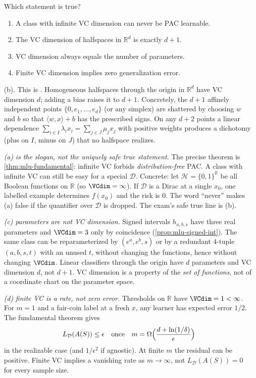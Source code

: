 \begin{exercise}
\label{ex:mlu-vc-mcq}
Which statement is true?
\begin{enumerate}[label=(\alph*)]
    \item A class with infinite VC dimension can never be PAC learnable.
    \item The VC dimension of halfspaces in $\mathbb{R}^d$ is exactly $d+1$.
    \item VC dimension always equals the number of parameters.
    \item Finite VC dimension implies zero generalization error.
\end{enumerate}
\end{exercise}

\begin{solution}
(b). This is . Homogeneous halfspaces through the origin in $\mathbb{R}^d$ have VC dimension $d$; adding a bias raises it to $d+1$. Concretely, the $d+1$ affinely independent points $\{0,e_1,\dots,e_d\}$ (or any simplex) are shattered by choosing $w$ and $b$ so that $\langle w,x\rangle+b$ has the prescribed signs. On any $d+2$ points a linear dependence $\sum_{i\in I}\lambda_i x_i=\sum_{j\in J}\mu_j x_j$ with positive weights produces a dichotomy (plus on $I$, minus on $J$) that no halfspace realizes.

\textit{(a) is the slogan, not the uniquely safe true statement.}
The precise theorem is \cref{thm:mlu-fundamental}: infinite VC forbids \emph{distribution-free} PAC. A class with infinite VC can still be easy for a special $\mathcal{D}$. Concrete: let $\mathcal{H}=\{0,1\}^{\mathbb{R}}$ be all Boolean functions on $\mathbb{R}$ (so $\VCdim=\infty$). If $\mathcal{D}$ is a Dirac at a single $x_0$, one labelled example determines $f(x_0)$ and the risk is $0$. The word ``never'' makes (a) false if the quantifier over $\mathcal{D}$ is dropped. The exam's safe true line is (b).

\textit{(c) parameters are not VC dimension.}
Signed intervals $h_{a,b,s}$ have three real parameters and $\VCdim=3$ only by coincidence (\cref{prop:mlu-signed-int}). The same class can be reparameterized by $(e^a,e^b,s)$ or by a redundant $4$-tuple $(a,b,s,t)$ with an unused $t$, without changing the functions, hence without changing $\VCdim$. Linear classifiers through the origin have $d$ parameters and VC dimension $d$, not $d+1$. VC dimension is a property of the \emph{set of functions}, not of a coordinate chart on the parameter space.

\textit{(d) finite VC is a rate, not zero error.}
Thresholds on $\mathbb{R}$ have $\VCdim=1<\infty$. For $m=1$ and a fair-coin label at a fresh $x$, any learner has expected error $1/2$. The fundamental theorem gives
\[
L_{\mathcal{D}}(A(S))\le\epsilon
\quad\text{once}\quad
m=\Omega\Bigl(\frac{d+\ln(1/\delta)}{\epsilon}\Bigr)
\]
in the realizable case (and $1/\epsilon^2$ if agnostic). At finite $m$ the residual can be positive. Finite VC implies a vanishing rate as $m\to\infty$, not $L_{\mathcal{D}}(A(S))=0$ for every sample size.
\end{solution}

